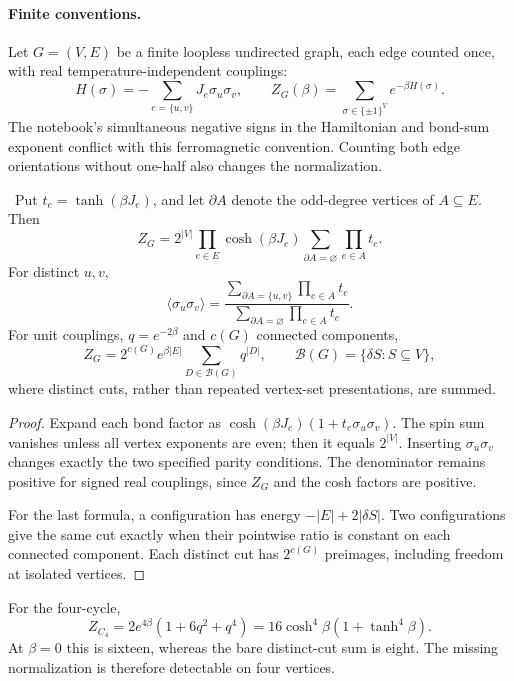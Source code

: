 \paragraph{Finite conventions.}
Let $G=(V,E)$ be a finite loopless undirected graph, each edge counted
once, with real temperature-independent couplings:
\[
 H(\sigma)=-\sum_{e=\{u,v\}}J_e\sigma_u\sigma_v,
 \qquad
 Z_G(\beta)=\sum_{\sigma\in\{\pm1\}^V}e^{-\beta H(\sigma)}.
\]
The notebook's simultaneous negative signs in the Hamiltonian and
bond-sum exponent conflict with this ferromagnetic convention.
Counting both edge orientations without one-half also changes the
normalization.

\begin{proposition}
\ours\ Put $t_e=\tanh(\beta J_e)$, and let $\partial A$ denote the
odd-degree vertices of $A\subseteq E$. Then
\[
 Z_G=2^{|V|}\prod_{e\in E}\cosh(\beta J_e)
       \sum_{\partial A=\varnothing}\prod_{e\in A}t_e.
\]
For distinct $u,v$,
\[
 \langle\sigma_u\sigma_v\rangle=
 \frac{\sum_{\partial A=\{u,v\}}\prod_{e\in A}t_e}
      {\sum_{\partial A=\varnothing}\prod_{e\in A}t_e}.
\]
For unit couplings, $q=e^{-2\beta}$ and $c(G)$ connected components,
\[
 Z_G=2^{c(G)}e^{\beta|E|}
       \sum_{D\in\mathcal B(G)}q^{|D|},
 \qquad
 \mathcal B(G)=\{\delta S:S\subseteq V\},
\]
where distinct cuts, rather than repeated vertex-set presentations,
are summed.
\end{proposition}

\begin{proof}
Expand each bond factor as
$\cosh(\beta J_e)(1+t_e\sigma_u\sigma_v)$.
The spin sum vanishes unless all vertex exponents are even; then it
equals $2^{|V|}$. Inserting $\sigma_u\sigma_v$ changes exactly the two
specified parity conditions. The denominator remains positive for
signed real couplings, since $Z_G$ and the cosh factors are positive.

For the last formula, a configuration has energy
$-|E|+2|\delta S|$. Two configurations give the same cut exactly when
their pointwise ratio is constant on each connected component.
Each distinct cut has $2^{c(G)}$ preimages, including freedom at
isolated vertices.
\end{proof}

For the four-cycle,
\[
 Z_{C_4}=2e^{4\beta}(1+6q^2+q^4)
       =16\cosh^4\beta(1+\tanh^4\beta).
\]
At $\beta=0$ this is sixteen, whereas the bare distinct-cut sum is eight.
The missing normalization is therefore detectable on four vertices.

